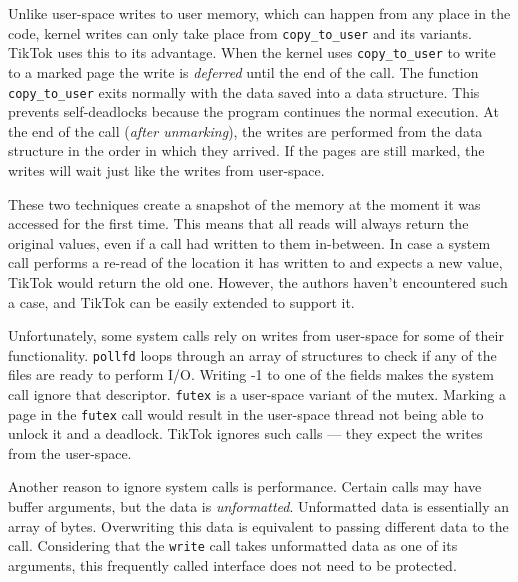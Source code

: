 Unlike user-space writes to user memory, which can happen from any place in the
code, kernel writes can only take place from \texttt{copy\_to\_user} and its
variants. TikTok uses this to its advantage. When the kernel uses
\texttt{copy\_to\_user} to write to a marked page the write is \emph{deferred}
until the end of the call. The function \texttt{copy\_to\_user} exits normally
with the data saved into a data structure. This prevents self-deadlocks because
the program continues the normal execution. At the end of the call (\emph{after
unmarking}), the writes are performed from the data structure in the order in
which they arrived. If the pages are still marked, the writes will wait just
like the writes from user-space.

These two techniques create a snapshot of the memory at the moment it
was accessed for the first time. This means that all reads will always return
the original values, even if a call had written to them in-between. In case a
system call performs a re-read of the location it has written to and expects a
new value, TikTok would return the old one. However, the authors haven't
encountered such a case, and TikTok can be easily extended to support it. 

Unfortunately, some system calls rely on writes from user-space for some of their
functionality. \texttt{pollfd}\cite{pollfd} loops through an array of structures
to check if any of the files are ready to perform I/O. Writing -1 to one of the
fields makes the system call ignore that descriptor. \texttt{futex}\cite{futex}
is a user-space variant of the mutex. Marking a page in the \texttt{futex} call
would result in the user-space thread not being able to unlock it and a deadlock.
TikTok ignores such calls ---  they expect the writes from the user-space.

Another reason to ignore system calls is performance. Certain calls may have
buffer arguments, but the data is \emph{unformatted}. Unformatted data is
essentially an array of bytes. Overwriting this data is equivalent to passing
different data to the call. Considering that the \texttt{write} call takes
unformatted data as one of its arguments, this frequently called interface does
not need to be protected.


